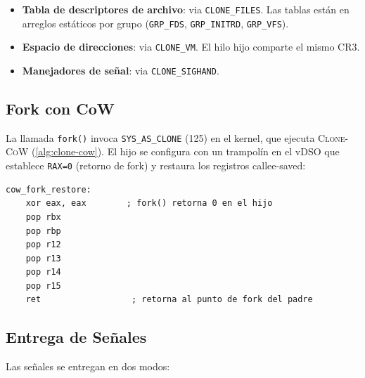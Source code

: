 \documentclass[11pt,twoside,openright]{book}
\theoremstyle{definition}
\theoremstyle{plain}
\theoremstyle{remark}
\begin{document}
\begin{itemize}
    \item \textbf{Tabla de descriptores de archivo}: via \texttt{CLONE\_FILES}.
          Las tablas están en arreglos estáticos por grupo (\texttt{GRP\_FDS},
          \texttt{GRP\_INITRD}, \texttt{GRP\_VFS}).
    \item \textbf{Espacio de direcciones}: via \texttt{CLONE\_VM}. El hilo hijo
          comparte el mismo CR3.
    \item \textbf{Manejadores de señal}: via \texttt{CLONE\_SIGHAND}.
\end{itemize}

\subsection{Fork con CoW}

La llamada \texttt{fork()} invoca \texttt{SYS\_AS\_CLONE} (125) en el kernel,
que ejecuta \textsc{Clone-CoW} (\cref{alg:clone-cow}). El hijo se configura
con un trampolín en el vDSO que establece \texttt{RAX=0} (retorno de fork) y
restaura los registros callee-saved:

\begin{lstlisting}[language={[x86masm]Assembler},caption={Trampolín CoW fork child restore (vDSO 0xB80740).},label={lst:cow-trampoline}]
cow_fork_restore:
    xor eax, eax        ; fork() retorna 0 en el hijo
    pop rbx
    pop rbp
    pop r12
    pop r13
    pop r14
    pop r15
    ret                  ; retorna al punto de fork del padre
\end{lstlisting}

\subsection{Entrega de Señales}

Las señales se entregan en dos modos:
\end{document}
